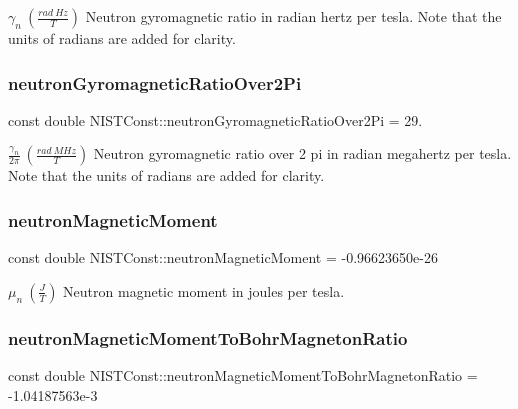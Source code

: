$\gamma_n \ (\frac{rad\ Hz}{T})$ Neutron gyromagnetic ratio in radian hertz per tesla. Note that the units of radians are added for clarity. \mbox{\label{group___n_i_s_t_const-_neutron_ga66ce4219c0fa9d7e9050e5bef3cb743c}} 
\subsubsection{\texorpdfstring{neutron\+Gyromagnetic\+Ratio\+Over2\+Pi}{neutronGyromagneticRatioOver2Pi}}
{\footnotesize\ttfamily const double N\+I\+S\+T\+Const\+::neutron\+Gyromagnetic\+Ratio\+Over2\+Pi = 29.}

$\frac{\gamma_n}{2\pi} \ (\frac{rad\ MHz}{T})$ Neutron gyromagnetic ratio over 2 pi in radian megahertz per tesla. Note that the units of radians are added for clarity. \mbox{\label{group___n_i_s_t_const-_neutron_ga42a101bcaf7105edbfd6c06de9633d22}} 
\subsubsection{\texorpdfstring{neutron\+Magnetic\+Moment}{neutronMagneticMoment}}
{\footnotesize\ttfamily const double N\+I\+S\+T\+Const\+::neutron\+Magnetic\+Moment = -\/0.\+96623650e-\/26}

$\mu_n \ (\frac{J}{T})$ Neutron magnetic moment in joules per tesla. \mbox{\label{group___n_i_s_t_const-_neutron_ga01b6142f2d5dd4cd6ff10d2938a312cf}} 
\subsubsection{\texorpdfstring{neutron\+Magnetic\+Moment\+To\+Bohr\+Magneton\+Ratio}{neutronMagneticMomentToBohrMagnetonRatio}}
{\footnotesize\ttfamily const double N\+I\+S\+T\+Const\+::neutron\+Magnetic\+Moment\+To\+Bohr\+Magneton\+Ratio = -\/1.\+04187563e-\/3}


